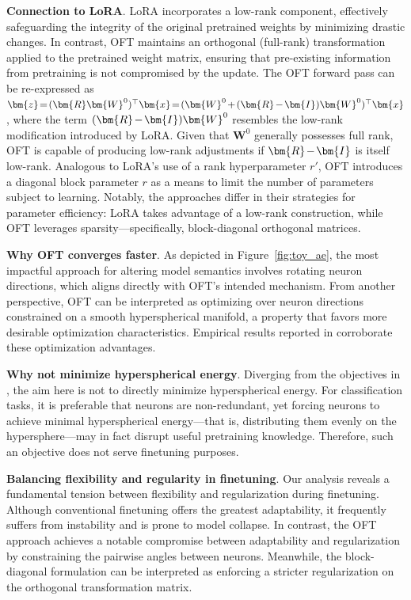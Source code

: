 \textbf{Connection to LoRA}. LoRA incorporates a low-rank component, effectively safeguarding the integrity of the original pretrained weights by minimizing drastic changes. In contrast, OFT maintains an orthogonal (full-rank) transformation applied to the pretrained weight matrix, ensuring that pre-existing information from pretraining is not compromised by the update. The OFT forward pass can be re-expressed as $\thickmuskip=2mu \medmuskip=2mu \bm{z}=(\bm{R}\bm{W}^0)^\top\bm{x}=(\bm{W}^0+(\bm{R}-\bm{I})\bm{W}^0)^\top\bm{x}$, where the term $\thickmuskip=2mu \medmuskip=2mu (\bm{R}-\bm{I})\bm{W}^0$ resembles the low-rank modification introduced by LoRA. Given that $\bm{W}^0$ generally possesses full rank, OFT is capable of producing low-rank adjustments if $\thickmuskip=2mu \medmuskip=2mu \bm{R}-\bm{I}$ is itself low-rank. Analogous to LoRA’s use of a rank hyperparameter $r'$, OFT introduces a diagonal block parameter $r$ as a means to limit the number of parameters subject to learning. Notably, the approaches differ in their strategies for parameter efficiency: LoRA takes advantage of a low-rank construction, while OFT leverages sparsity—specifically, block-diagonal orthogonal matrices.

\textbf{Why OFT converges faster}. As depicted in Figure~\ref{fig:toy_ae}, the most impactful approach for altering model semantics involves rotating neuron directions, which aligns directly with OFT’s intended mechanism. From another perspective, OFT can be interpreted as optimizing over neuron directions constrained on a smooth hyperspherical manifold, a property that favors more desirable optimization characteristics. Empirical results reported in \cite{liu2021orthogonal} corroborate these optimization advantages.

\textbf{Why not minimize hyperspherical energy}. Diverging from the objectives in \cite{liu2021orthogonal}, the aim here is not to directly minimize hyperspherical energy. For classification tasks, it is preferable that neurons are non-redundant, yet forcing neurons to achieve minimal hyperspherical energy—that is, distributing them evenly on the hypersphere—may in fact disrupt useful pretraining knowledge. Therefore, such an objective does not serve finetuning purposes.

\textbf{Balancing flexibility and regularity in finetuning}. Our analysis reveals a fundamental tension between flexibility and regularization during finetuning. Although conventional finetuning offers the greatest adaptability, it frequently suffers from instability and is prone to model collapse. In contrast, the OFT approach achieves a notable compromise between adaptability and regularization by constraining the pairwise angles between neurons. Meanwhile, the block-diagonal formulation can be interpreted as enforcing a stricter regularization on the orthogonal transformation matrix.

